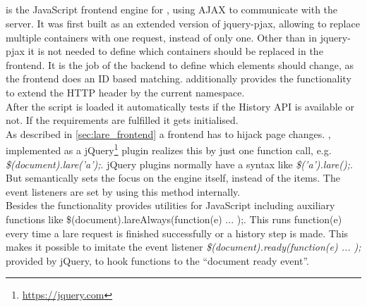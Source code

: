 \subsection{\lareJS{}}
\lareJS{} is the JavaScript frontend engine for \lare{}, using AJAX to communicate with the server.
It was first built as an extended version of jquery-pjax, allowing to replace multiple containers with one request, instead of only one.
Other than in jquery-pjax it is not needed to define which containers should be replaced in the frontend.
It is the job of the backend to define which elements should change, as the frontend does an ID based matching.
\lareJS{} additionally provides the functionality to extend the HTTP header by the current \lare{} namespace.
\\
After the script is loaded it automatically tests if the History API is available or not.
If the requirements are fulfilled it gets initialised.
\\
As described in \ref{sec:lare_frontend} a \lare{} frontend has to hijack page changes.
\lareJS{}, implemented as a jQuery\footnote{\url{https://jquery.com}} plugin realizes this by just one function call, e.g. \emph{\$(document).lare('a');}.
jQuery plugins normally have a syntax like \emph{\$('a').lare();}.
But semantically \lareJS{} sets the focus on the engine itself, instead of the items.
The event listeners are set by using this method internally.
\\
Besides the \lare{} functionality \lareJS{} provides utilities for JavaScript including auxiliary functions like \$(document).lareAlways(function(e) { ... });.
This runs function(e) {} every time a lare request is finished successfully or a history step is made.
This makes it possible to imitate the event listener \emph{\$(document).ready(function(e) { ... });} provided by jQuery, to hook functions to the \enquote{document ready event}.

